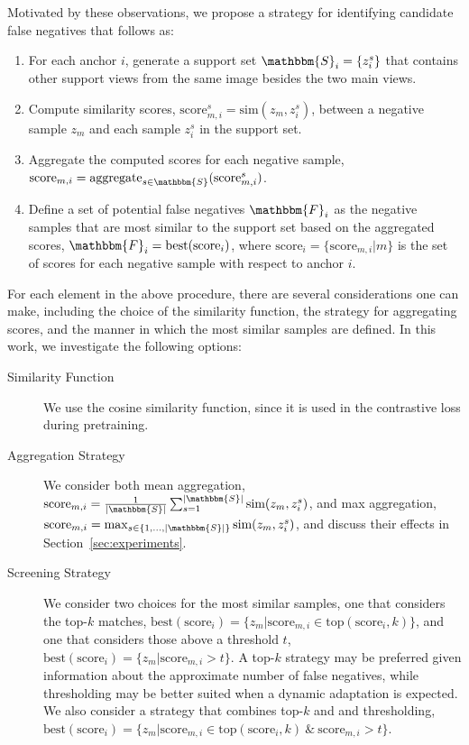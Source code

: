\documentclass[10pt,twocolumn,letterpaper]{article}
\begin{document}
Motivated by these observations, we propose a strategy for identifying candidate false negatives that follows as:
\begin{enumerate}
    \item For each anchor $i$, generate a support set $\mathbbm{S}_i=\{z_i^s\}$ that contains other support views from the same image besides the two main views.
\item Compute similarity scores, $\textrm{score}_{m,i}^s=\textrm{sim}(z_m,z_i^s)$, between a negative sample $z_m$
and each sample $z_i^s$ in the support set.
\item Aggregate the computed scores for each negative sample, $\textrm{score}_{m,i}=\textrm{aggregate}_{s\in \mathbbm{S}}(\textrm{score}_{m,i}^s)$.
\item Define a set of potential false negatives $\mathbbm{F}_i$ as the negative samples that are most similar to the support set based on the aggregated scores, $\mathbbm{F}_i=\textrm{best}(\textrm{score}_{i})$, where $\textrm{score}_i=\{\textrm{score}_{m,i} \vert m\}$ is the set of scores for each negative sample with respect to anchor $i$.
\end{enumerate}
For each element in the above procedure, there are several considerations one can make, including the choice of the similarity function, the strategy for aggregating scores, and the manner in which the most similar samples are defined. In this work, we investigate the following options:
\begin{description}
    \item[Similarity Function] We use the cosine similarity function, since it is used in the contrastive loss during pretraining.
\item[Aggregation Strategy] We consider both mean aggregation, $\textrm{score}_{m,i}=\frac{1}{\lvert \mathbbm{S} \rvert}\sum_{s=1}^{\lvert \mathbbm{S} \rvert}\textrm{sim}(z_m,z_i^s)$, and max aggregation, $\textrm{score}_{m,i}=\max_{s \in \{1, \ldots, \lvert \mathbbm{S} \rvert\}}\textrm{sim}(z_m,z_i^s)$, and discuss their effects in Section~\ref{sec:experiments}.
\item[Screening Strategy] We consider two choices for the most similar samples, one that considers the top-$k$ matches, $\textrm{best}(\textrm{score}_{i})=\{z_m \vert \textrm{score}_{m,i}\in \textrm{top}(\textrm{score}_{i},k)\}$, and one that considers those above a threshold $t$, $\textrm{best}(\textrm{score}_{i})=\{z_m \vert \textrm{score}_{m,i}>t\}$. A top-$k$ strategy may be preferred given information about the approximate number of false negatives, while thresholding may be better suited when a dynamic adaptation is expected. We also consider a strategy that combines top-$k$ and and thresholding, $\textrm{best}(\textrm{score}_{i})=\{z_m \vert \textrm{score}_{m,i}\in \textrm{top}(\textrm{score}_{i}, k) \: \& \: \textrm{score}_{m,i}>t\}$.
\end{description}
\end{document}
